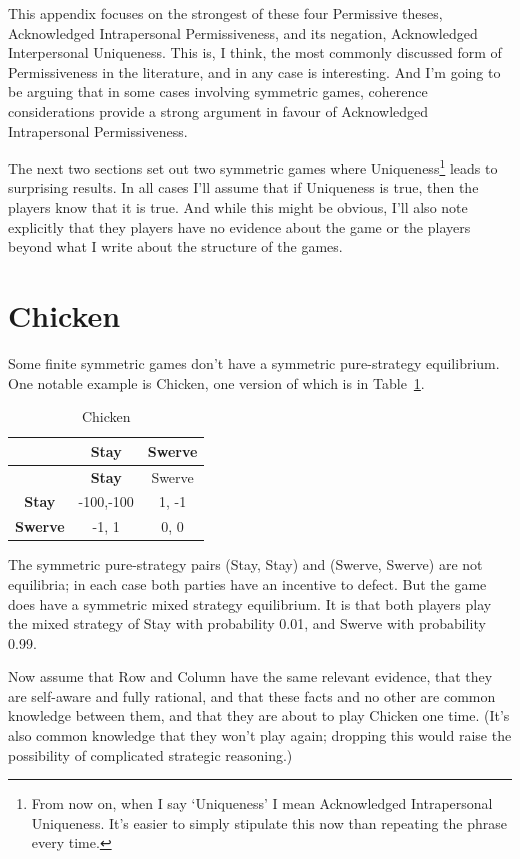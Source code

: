 \documentclass[
  12pt,
  letterpaper,
  DIV=11,
  numbers=noendperiod]{scrreprt}
\begin{document}
This appendix focuses on the strongest of these four Permissive theses,
Acknowledged Intrapersonal Permissiveness, and its negation,
Acknowledged Interpersonal Uniqueness. This is, I think, the most
commonly discussed form of Permissiveness in the literature, and in any
case is interesting. And I'm going to be arguing that in some cases
involving symmetric games, coherence considerations provide a strong
argument in favour of Acknowledged Intrapersonal Permissiveness.

The next two sections set out two symmetric games where
Uniqueness\footnote{From now on, when I say `Uniqueness' I mean
  Acknowledged Intrapersonal Uniqueness. It's easier to simply stipulate
  this now than repeating the phrase every time.} leads to surprising
results. In all cases I'll assume that if Uniqueness is true, then the
players know that it is true. And while this might be obvious, I'll also
note explicitly that they players have no evidence about the game or the
players beyond what I write about the structure of the games.

\section{Chicken}\label{chicken}

Some finite symmetric games don't have a symmetric pure-strategy
equilibrium. One notable example is Chicken, one version of which is in
Table~\ref{tbl-unique-chicken}.

\begin{longtable}[]{@{}ccc@{}}
\caption{Chicken}\label{tbl-unique-chicken}\tabularnewline
\toprule\noalign{}
& \textbf{Stay} & Swerve \\
\midrule\noalign{}
\endfirsthead
\toprule\noalign{}
& \textbf{Stay} & Swerve \\
\midrule\noalign{}
\endhead
\bottomrule\noalign{}
\endlastfoot
\textbf{Stay} & -100,-100 & 1, -1 \\
\textbf{Swerve} & -1, 1 & 0, 0 \\
\end{longtable}

The symmetric pure-strategy pairs (Stay, Stay) and (Swerve, Swerve) are
not equilibria; in each case both parties have an incentive to defect.
But the game does have a symmetric mixed strategy equilibrium. It is
that both players play the mixed strategy of Stay with probability 0.01,
and Swerve with probability 0.99.

Now assume that Row and Column have the same relevant evidence, that
they are self-aware and fully rational, and that these facts and no
other are common knowledge between them, and that they are about to play
Chicken one time. (It's also common knowledge that they won't play
again; dropping this would raise the possibility of complicated
strategic reasoning.)
\end{document}
